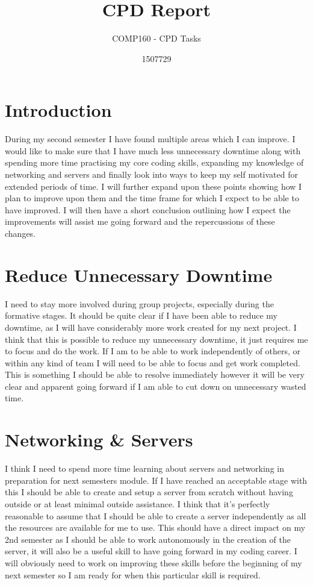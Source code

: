 \documentclass{scrartcl}
\title{CPD Report}
\subtitle{COMP160 - CPD Tasks}
\author{1507729}
\begin{document}
\maketitle

\section{Introduction}

During my second semester I have found multiple areas which I can improve. I would like to make sure that I have much less unnecessary downtime along with spending more time practising my core coding skills, expanding my knowledge of networking and servers and finally look into ways to keep my self motivated for extended periods of time.  I will further expand upon these points showing how I plan to improve upon them and the time frame for which I expect to be able to have improved. I will then have a short conclusion outlining how I expect the improvements will assist me going forward and the repercussions of these changes.

\section{Reduce Unnecessary Downtime}

I need to stay more involved during group projects, especially during the formative stages. It should be quite clear if I have been able to reduce my downtime, as I will have considerably more work created for my next project. I think that this is possible to reduce my unnecessary downtime, it just requires me to focus and do the work. If I am to be able to work independently of others, or within any kind of team I will need to be able to focus and get work completed. This is something I should be able to resolve immediately however it will be very clear and apparent going forward if I am able to cut down on unnecessary wasted time. 


\section{Networking \& Servers}

I think I need to spend more time learning about servers and networking in preparation for next semesters module. If I have reached an acceptable stage with this I should be able to create and setup a server from scratch without having outside or at least minimal outside assistance. I think that it's perfectly reasonable to assume that I should be able to create a server independently as all the resources are available for me to use. This should have a direct impact on my 2nd semester as I should be able to work autonomously in the creation of the server, it will also be a useful skill to have going forward in my coding career. I will obviously need to work on improving these skills before the beginning of my next semester so I am ready for when this particular skill is required. 
\end{document}
